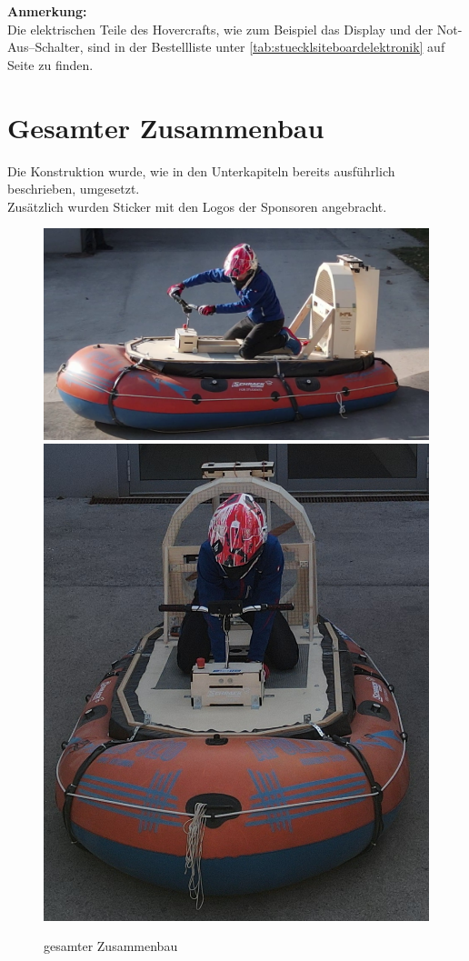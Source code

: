 \textbf{Anmerkung:}\\
Die elektrischen Teile des Hovercrafts, wie zum Beispiel das Display und der Not-Aus--Schalter, sind in der Bestellliste unter \autoref{tab:stuecklsiteboardelektronik} auf Seite \pageref{tab:stuecklsiteboardelektronik} zu finden.

\clearpage
\section{Gesamter Zusammenbau}
Die Konstruktion wurde, wie in den Unterkapiteln bereits ausführlich beschrieben, umgesetzt.\\
Zusätzlich wurden Sticker mit den Logos der Sponsoren angebracht.
\begin{figure}[H]
    \centering
    \includegraphics[width=.8\textwidth]{Fotos/Konstruktion/gesamt_2.png}
    \includegraphics[width=.5\textwidth]{Fotos/Konstruktion/gesamt_1.png}
    \caption{gesamter Zusammenbau}
\end{figure}

